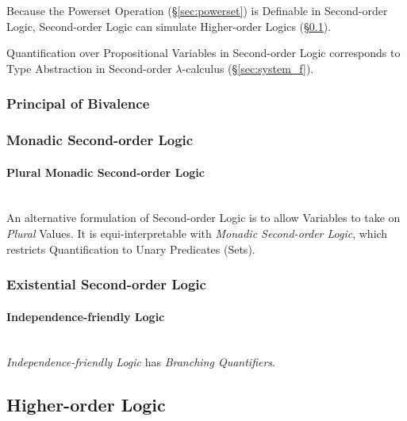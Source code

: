 Because the Powerset Operation (\S\ref{sec:powerset}) is Definable in
Second-order Logic, Second-order Logic can simulate Higher-order
Logics (\S\ref{sec:higherorder_logic}).

Quantification over Propositional Variables in Second-order Logic
corresponds to Type Abstraction in Second-order $\lambda$-calculus
(\S\ref{sec:system_f}).



\subsubsection{Principal of Bivalence}\label{sec:bivalence_principal}

\subsubsection{Monadic Second-order Logic}\label{sec:monadic_secondorder}

\paragraph{Plural Monadic Second-order Logic}\hfill
\label{sec:plural_monadic_secondorder}\hfill \\

An alternative formulation of Second-order Logic is to allow Variables
to take on \emph{Plural} Values. It is equi-interpretable with
\emph{Monadic Second-order Logic}, which restricts Quantification to
Unary Predicates (Sets).



\subsubsection{Existential Second-order Logic}
\label{sec:existential_secondorder}

\paragraph{Independence-friendly\hfill
  Logic}\label{sec:independence_logic}\hfill \\

\emph{Independence-friendly Logic} has \emph{Branching Quantifiers}.



\subsection{Higher-order Logic}\label{sec:higherorder_logic}

